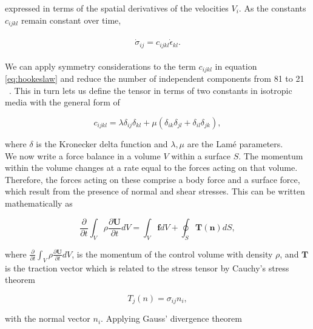 expressed in terms of the spatial derivatives of the velocities $V_i$. As the constants $c_{ijkl}$ remain constant over time,

\begin{align}
    \begin{split}
        \dot{\sigma}_{ij} = c_{ijkl}\dot{\epsilon}_{kl} .
    \end{split}
    \label{eq:stress}
\end{align}

We can apply symmetry considerations to the term $c_{ijkl}$ in equation \ref{eq:hookeslaw} and reduce the number of independent components from 81 to 21 ~\parencite[Cha. 2]{aki2002quantitative}.
This in turn lets us define the tensor in terms of two constants in isotropic media with the general form of

\begin{equation}
    c_{ijkl} = \lambda \delta_{ij}\delta_{kl} + \mu\left(\delta_{ik}\delta_{jl} + \delta_{il}\delta_{jk}\right),
    \label{eq:isotropic}
\end{equation}

where $\delta$ is the Kronecker delta function and $\lambda, \mu$ are the Lam\'e parameters. \\

We now write a force balance in a volume $V$ within a surface $S$. The momentum within the volume changes at a rate equal
to the forces acting on that volume. Therefore, the forces acting on these comprise a body force and a surface force, which result
from the presence of normal and shear stresses. This can be written mathematically as 

\begin{equation}
    \frac{\partial}{\partial t} \int_V \rho \frac{\partial \mathbf{U}}{\partial t}dV = \int_V \mathbf{f}dV + \oint_S \mathbf{T\left(n\right)}dS,
    \label{eq:forcebalance}
\end{equation}

where $\frac{\partial}{\partial t} \int_V \rho \frac{\partial \mathbf{U}}{\partial t}dV$, is the momentum of the control volume with density $\rho$, and $\mathbf{T}$
is the traction vector which is related to the stress tensor by Cauchy's stress theorem %

\begin{equation}
    T_j\left(n\right) = \sigma_{ij}n_i,
    \label{eq:tractionvector}
\end{equation}

with the normal vector $n_i$. Applying Gauss' divergence theorem

